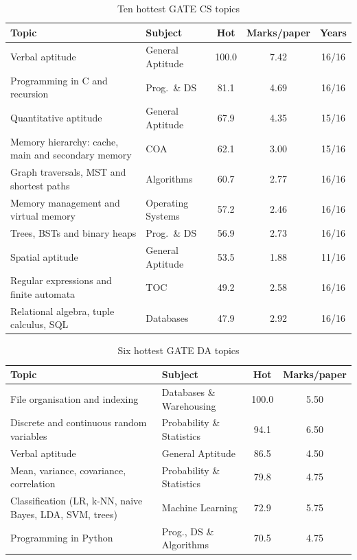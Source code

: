 \begin{table}[h]
\centering
\caption{Ten hottest GATE CS topics}
\label{tab:hot-cs}
\small
\begin{tabularx}{\textwidth}{@{}Xlccc@{}}
\toprule
\textbf{Topic} & \textbf{Subject} & \textbf{Hot} & \textbf{Marks/paper} & \textbf{Years}\\
\midrule
Verbal aptitude & General Aptitude & 100.0 & 7.42 & 16/16\\
Programming in C and recursion & Prog.\ \& DS & 81.1 & 4.69 & 16/16\\
Quantitative aptitude & General Aptitude & 67.9 & 4.35 & 15/16\\
Memory hierarchy: cache, main and secondary memory & COA & 62.1 & 3.00 & 15/16\\
Graph traversals, MST and shortest paths & Algorithms & 60.7 & 2.77 & 16/16\\
Memory management and virtual memory & Operating Systems & 57.2 & 2.46 & 16/16\\
Trees, BSTs and binary heaps & Prog.\ \& DS & 56.9 & 2.73 & 16/16\\
Spatial aptitude & General Aptitude & 53.5 & 1.88 & 11/16\\
Regular expressions and finite automata & TOC & 49.2 & 2.58 & 16/16\\
Relational algebra, tuple calculus, SQL & Databases & 47.9 & 2.92 & 16/16\\
\bottomrule
\end{tabularx}
\end{table}

\begin{table}[h]
\centering
\caption{Six hottest GATE DA topics}
\label{tab:hot-da}
\small
\begin{tabularx}{\textwidth}{@{}Xlcc@{}}
\toprule
\textbf{Topic} & \textbf{Subject} & \textbf{Hot} & \textbf{Marks/paper}\\
\midrule
File organisation and indexing & Databases \& Warehousing & 100.0 & 5.50\\
Discrete and continuous random variables & Probability \& Statistics & 94.1 & 6.50\\
Verbal aptitude & General Aptitude & 86.5 & 4.50\\
Mean, variance, covariance, correlation & Probability \& Statistics & 79.8 & 4.75\\
Classification (LR, k-NN, naive Bayes, LDA, SVM, trees) & Machine Learning & 72.9 & 5.75\\
Programming in Python & Prog., DS \& Algorithms & 70.5 & 4.75\\
\bottomrule
\end{tabularx}
\end{table}

